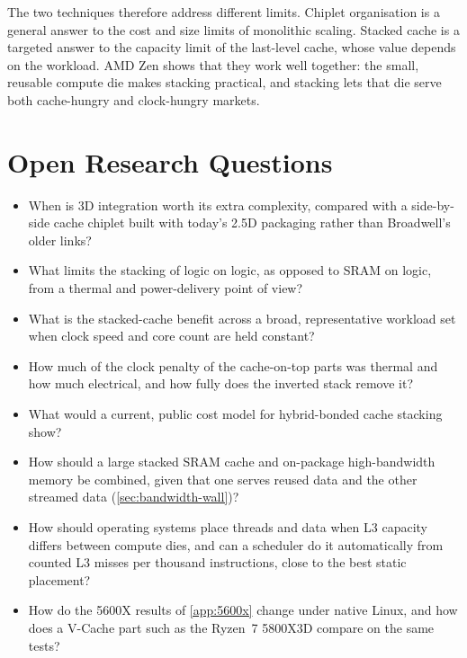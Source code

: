 The two techniques therefore address different limits. Chiplet organisation is a general answer to the cost and size limits of monolithic scaling. Stacked cache is a targeted answer to the capacity limit of the last-level cache, whose value depends on the workload. AMD Zen shows that they work well together: the small, reusable compute die makes stacking practical, and stacking lets that die serve both cache-hungry and clock-hungry markets.

\section{Open Research Questions}
\label{sec:open-questions}
\begin{itemize}
  \item When is 3D integration worth its extra complexity, compared with a side-by-side cache chiplet built with today's 2.5D packaging rather than Broadwell's older links?
  \item What limits the stacking of logic on logic, as opposed to SRAM on logic, from a thermal and power-delivery point of view?
  \item What is the stacked-cache benefit across a broad, representative workload set when clock speed and core count are held constant?
  \item How much of the clock penalty of the cache-on-top parts was thermal and how much electrical, and how fully does the inverted stack remove it?
  \item What would a current, public cost model for hybrid-bonded cache stacking show?
  \item How should a large stacked SRAM cache and on-package high-bandwidth memory be combined, given that one serves reused data and the other streamed data (\cref{sec:bandwidth-wall})?
  \item How should operating systems place threads and data when L3 capacity differs between compute dies, and can a scheduler do it automatically from counted L3 misses per thousand instructions, close to the best static placement?
  \item How do the 5600X results of \cref{app:5600x} change under native Linux, and how does a V-Cache part such as the Ryzen~7 5800X3D compare on the same tests?
\end{itemize}
